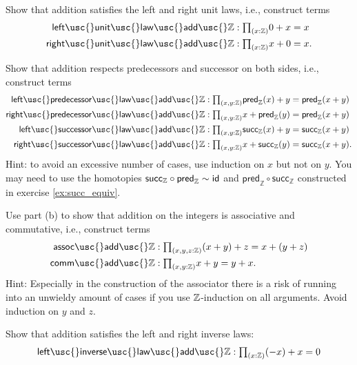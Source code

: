 \begin{exercises}
\begin{subexenum}
  \item Show that addition satisfies the left and right unit laws, i.e., construct terms
    \begin{align*}
      \mathsf{left\usc{}unit\usc{}law\usc{}add\usc{}}\Z  & : \prd{x:\Z} 0 + x = x \\
      \mathsf{right\usc{}unit\usc{}law\usc{}add\usc{}}\Z  & : \prd{x : \Z} x + 0 = x.
    \end{align*}
  \item Show that addition respects predecessors and successor on both sides, i.e., construct terms
    \begin{align*}
      \mathsf{left\usc{}predecessor\usc{}law\usc{}add\usc{}}\Z & : \prd{x,y:\Z} \mathsf{pred}_{\mathbb{Z}}(x)+y = \mathsf{pred}_{\mathbb{Z}}(x+y) \\
      \mathsf{right\usc{}predecessor\usc{}law\usc{}add\usc{}}\Z & : \prd{x,y:\Z} x+\mathsf{pred}_{\mathbb{Z}}(y) = \mathsf{pred}_{\mathbb{Z}}(x+y) \\
      \mathsf{left\usc{}successor\usc{}law\usc{}add\usc{}}\Z & : \prd{x,y:\Z} \mathsf{succ}_{\mathbb{Z}}(x)+y = \mathsf{succ}_{\mathbb{Z}}(x+y) \\
      \mathsf{right\usc{}successor\usc{}law\usc{}add\usc{}}\Z & : \prd{x,y:\Z} x+\mathsf{succ}_{\mathbb{Z}}(y) = \mathsf{succ}_{\mathbb{Z}}(x+y).
    \end{align*}
    Hint: to avoid an excessive number of cases, use induction on $x$ but not on $y$. You may need to use the homotopies $\mathsf{succ}_{\mathbb{Z}}\circ \mathsf{pred}_{\mathbb{Z}}\sim \mathsf{id}_{}$ and $\mathsf{pred}_{\mathbb{Z}}\circ\mathsf{succ}_{\mathbb{Z}}$ constructed in exercise \cref{ex:succ_equiv}.
  \item Use part (b) to show that addition on the integers is associative and commutative, i.e., construct terms
    \begin{align*}
      \mathsf{assoc\usc{}add\usc{}}\Z & : \prd{x,y,z:\Z} (x+y)+z = x + (y+z) \\
      \mathsf{comm\usc{}add\usc{}}\Z & : \prd{x,y:\Z} x+y = y+x.
    \end{align*}
    Hint: Especially in the construction of the associator there is a risk of running into an unwieldy amount of cases if you use ${\mathbb{Z}}$-induction on all arguments. Avoid induction on $y$ and $z$.
  \item Show that addition satisfies the left and right inverse laws:
    \begin{align*}
      \mathsf{left\usc{}inverse\usc{}law\usc{}add\usc{}}\Z & : \prd{x : \Z} (-x)+x=0 \\

\end{align*}
\end{subexenum}
\end{exercises}
